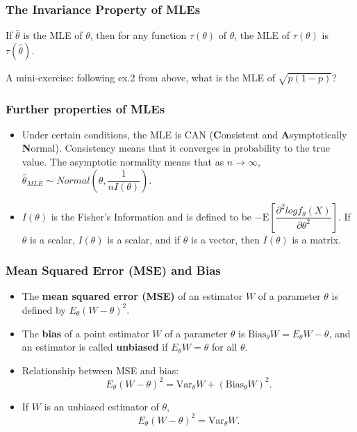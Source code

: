 \documentclass{beamer}
\begin{document}
\begin{frame}
\frametitle{The Invariance Property of MLEs}
\begin{theorem}
If $\hat{\theta}$ is the MLE of $\theta$, then for any function $\tau(\theta)$ of $\theta$, the MLE of $\tau(\theta)$ is $\tau(\hat{\theta})$.
\end{theorem}

\vspace*{0.7in}
A mini-exercise: following ex.2 from above, what is the MLE of $\sqrt{p(1-p)}$?
\end{frame}

\begin{frame}
\frametitle{Further properties of MLEs}
\begin{itemize}
    \item Under certain conditions, the MLE is CAN (\textbf{C}onsistent and \textbf{A}symptotically \textbf{N}ormal). Consistency means that it converges in probability to the true value. The asymptotic normality means that as $n \rightarrow \infty$, $\hat{\theta}_{MLE} \sim Normal \left( \theta, \dfrac{1}{n I(\theta)} \right)$.
    \bigskip
    \item $I(\theta)$ is the Fisher's Information and is defined to be $- \mathrm{E} \left[ \dfrac{\partial^2 log f_{\theta}(X)}{\partial \theta^2} \right]$. If $\theta$ is a scalar, $I(\theta)$ is a scalar, and if $\theta$ is a vector, then $I(\theta)$ is a matrix. 
\end{itemize}
\end{frame}


\begin{frame}
\frametitle{Mean Squared Error (MSE) and Bias}
\begin{itemize}
\item The \textbf{mean squared error (MSE)} of an estimator $W$ of a parameter $\theta$ is defined by $E_{\theta}(W-\theta)^2$.
\item The \textbf{bias} of a point estimator $W$ of a parameter $\theta$ is $\text{Bias}_{\theta}W=E_{\theta}W-\theta$, and an estimator is called \textbf{unbiased} if $E_{\theta}W=\theta$ for all $\theta$.
\item Relationship between MSE and bias:
$$
E_{\theta}(W-\theta)^2 = \text{Var}_{\theta}W + (\text{Bias}_{\theta}W)^2.
$$
\item If $W$ is an unbiased estimator of $\theta$,
$$
E_{\theta}(W-\theta)^2 = \text{Var}_{\theta}W.
$$
\end{itemize}
\end{frame}
\end{document}
